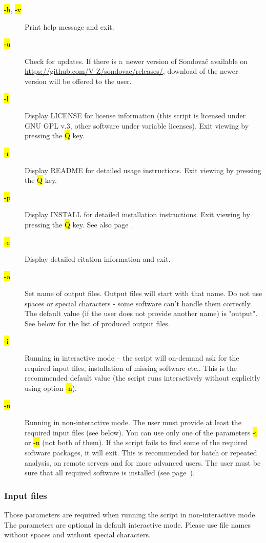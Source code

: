 \documentclass[a4paper, 11pt, twoside]{article}
\renewcommand{\texttt}[1]{\hl{\ttfamily #1}}
\begin{document}
\begin{description}
  \item[\texttt{-h}, \texttt{-v}] Print help message and exit.
  \item[\texttt{-u}] Check for updates. If there is a~newer version of Sondovač available on \url{https://github.com/V-Z/sondovac/releases/}, download of the newer version will be offered to the user.
  \item[\texttt{-l}] Display LICENSE for license information (this script is licensed under GNU GPL v.3, other software under variable licenses). Exit viewing by pressing the \texttt{Q} key.
  \item[\texttt{-r}] Display README for detailed usage instructions. Exit viewing by pressing the \texttt{Q} key.
  \item[\texttt{-p}] Display INSTALL for detailed installation instructions. Exit viewing by pressing the \texttt{Q} key. See also page~\pageref{install}.
  \item[\texttt{-e}] Display detailed citation information and exit.
  \item[\texttt{-o}] Set name of output files. Output files will start with that name. Do not use spaces or special characters - some software can't handle them correctly. The default value (if the user does not provide another name) is "output". See below for the list of produced output files.
  \item[\texttt{-i}] Running in interactive mode -- the script will on-demand ask for the required input files, installation of missing software etc.. This is the recommended default value (the script runs interactively without explicitly using option \texttt{-n}).
  \item[\texttt{-n}] Running in non-interactive mode. The user must provide at least the required input files (see below). You can use only one of the parameters \texttt{-i} or \texttt{-n} (not both of them). If the script fails to find some of the required software packages, it will exit. This is recommended for batch or repeated analysis, on remote servers and for more advanced users. The user must be sure that all required software is installed (see page~\pageref{install}).
\end{description}

\subsubsection{Input files}

Those parameters are required when running the script in non-interactive mode. The parameters are optional in default interactive mode. Please use file names without spaces and without special characters.
\end{document}
